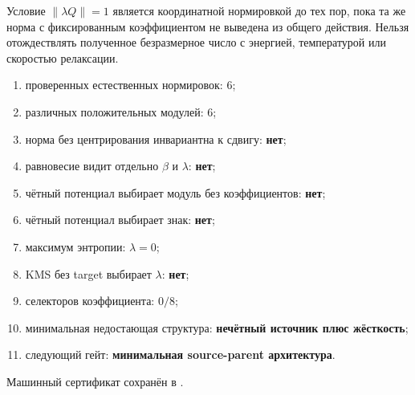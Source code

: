 \begin{nogocriterion}
Условие $\lVert\lambda Q\rVert=1$ является координатной нормировкой до тех
пор, пока та же норма с фиксированным коэффициентом не выведена из общего
действия. Нельзя отождествлять полученное безразмерное число с энергией,
температурой или скоростью релаксации.
\end{nogocriterion}

\begin{protocol}\begin{enumerate}
\item проверенных естественных нормировок: \textbf{$6$};
\item различных положительных модулей: \textbf{$6$};
\item норма без центрирования инвариантна к сдвигу: \textbf{нет};
\item равновесие видит отдельно $\beta$ и $\lambda$: \textbf{нет};
\item чётный потенциал выбирает модуль без коэффициентов: \textbf{нет};
\item чётный потенциал выбирает знак: \textbf{нет};
\item максимум энтропии: \textbf{$\lambda=0$};
\item KMS без target выбирает $\lambda$: \textbf{нет};
\item селекторов коэффициента: \textbf{$0/8$};
\item минимальная недостающая структура: \textbf{нечётный источник плюс жёсткость};
\item следующий гейт: \textbf{минимальная source-parent архитектура}.
\end{enumerate}\end{protocol}

Машинный сертификат сохранён в
.